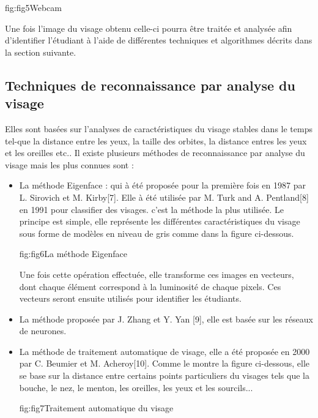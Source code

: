 \documentclass[overfullbox]{polytech/polytech}
\begin{document}
\begin{Figure}{fig:fig5}{Webcam}
\end{Figure}


Une fois l'image du visage obtenu celle-ci pourra être traitée et analysée afin d'identifier l'étudiant à l'aide de différentes techniques et algorithmes décrits dans la section suivante.


\subsection{Techniques de reconnaissance par analyse du visage}
 Elles sont basées sur l'analyses de caractéristiques du visage stables dans le temps tel-que la distance entre les yeux, la taille des orbites, la distance entres les yeux et les oreilles etc.. Il existe plusieurs méthodes de reconnaissance par analyse du visage mais les plus connues sont : 
 
\begin{itemize}
\item La méthode Eigenface : qui à été proposée pour la première fois en 1987 par L. Sirovich et M. Kirby[7]. Elle à été utilisée par M. Turk and A. Pentland[8] en 1991 pour classifier des visages. c'est la méthode la plus utilisée. Le principe est simple, elle représente les différentes caractéristiques du visage sous forme de modèles en niveau de gris comme dans la figure ci-dessous.

\begin{Figure}{fig:fig6}{La méthode Eigenface}
\end{Figure}

Une fois cette opération effectuée, elle transforme ces images en vecteurs, dont chaque élément correspond à la luminosité de chaque pixels. Ces vecteurs seront ensuite utilisés pour identifier les étudiants.
\item La méthode proposée par J. Zhang et Y. Yan [9], elle est basée sur les réseaux de neurones.
\item La méthode de traitement automatique de visage, elle a été proposée en 2000 par C. Beumier et M. Acheroy[10]. Comme le montre la figure ci-dessous, elle se base sur la distance entre certains points particuliers du visages tels que la bouche, le nez, le menton, les oreilles, les yeux et les sourcils...

\begin{Figure}{fig:fig7}{Traitement automatique du visage}
\end{Figure}
\end{itemize}
\end{document}

